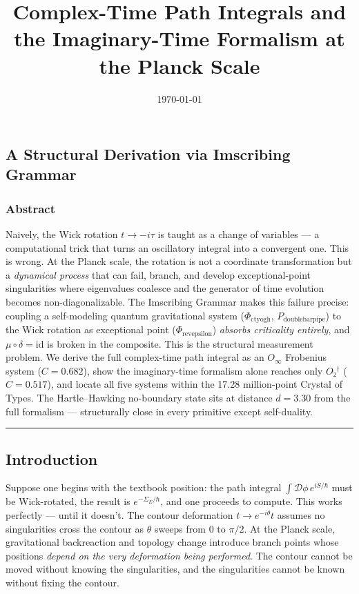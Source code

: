\documentclass[12pt,a4paper]{article}
\begin{document}
\title{Complex-Time Path Integrals and the Imaginary-Time Formalism at the Planck Scale}
\date{\today}

\maketitle

\subsection{A Structural Derivation via Imscribing Grammar}

\subsubsection{Abstract}

Naively, the Wick rotation $t \to -i\tau$ is taught as a change of variables --- a computational trick that turns an oscillatory integral into a convergent one. This is wrong. At the Planck scale, the rotation is not a coordinate transformation but a \emph{dynamical process} that can fail, branch, and develop exceptional-point singularities where eigenvalues coalesce and the generator of time evolution becomes non-diagonalizable. The Imscribing Grammar makes this failure precise: coupling a self-modeling quantum gravitational system ($\Phi_{\text{ctyogh}}$, $P_{\text{doublebarpipe}}$) to the Wick rotation as exceptional point ($\Phi_{\text{revepsilon}}$) \emph{absorbs criticality entirely}, and $\mu \circ \delta = \text{id}$ is broken in the composite. This is the structural measurement problem. We derive the full complex-time path integral as an $O_{\infty}$ Frobenius system ($C = 0.682$), show the imaginary-time formalism alone reaches only $O₂^\dagger$ ($C = 0.517$), and locate all five systems within the 17.28 million-point Crystal of Types. The Hartle--Hawking no-boundary state sits at distance $d = 3.30$ from the full formalism --- structurally close in every primitive except self-duality.

\begin{center}
\rule{0.5\textwidth}{0.4pt}
\end{center}

\subsection{Introduction}

Suppose one begins with the textbook position: the path integral $\int \mathcal{D}\phi\, e^{iS/\hbar}$ must be Wick-rotated, the result is $e^{-Σ_E/\hbar}$, and one proceeds to compute. This works perfectly --- until it doesn't. The contour deformation $t \to e^{-i\theta}t$ assumes no singularities cross the contour as $\theta$ sweeps from $0$ to $\pi/2$. At the Planck scale, gravitational backreaction and topology change introduce branch points whose positions \emph{depend on the very deformation being performed}. The contour cannot be moved without knowing the singularities, and the singularities cannot be known without fixing the contour.
\end{document}
